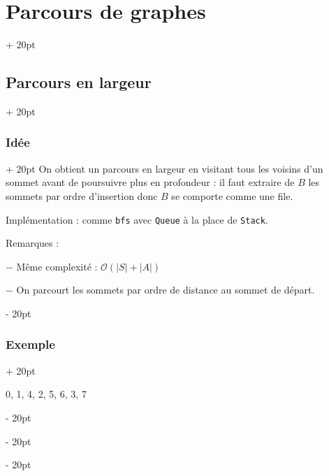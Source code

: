 \documentclass[a4paper, 12pt, twoside]{article}
\newcommand{\abs}[1]{\left\lvert #1 \right\rvert}
\newcommand{\ind}[1][20pt]{\advance\leftskip + #1}
\newcommand{\deind}[1][20pt]{\advance\leftskip - #1}
\newenvironment{indt}[2][20pt]{#2 \par \ind[#1]}{\par \deind} %
\begin{document}
\begin{indt}{\section{Parcours de graphes}}
        \vspace{12pt}
        
        \begin{indt}{\subsection{Parcours en largeur}}
            \begin{indt}{\subsubsection{Idée}}
                On obtient un parcours en largeur en visitant tous les voisins d'un sommet avant de poursuivre plus en profondeur : il faut extraire de $B$ les sommets par ordre d'insertion donc $B$ se comporte comme une file.

                Implémentation : comme \texttt{bfs} avec \texttt{Queue} à la place de \texttt{Stack}.

                Remarques :

                $-$ Même complexité : $\mathcal O(\abs S + \abs A)$

                $-$ On parcourt les sommets par ordre de distance au sommet de départ.
            \end{indt}

            \vspace{12pt}
            
            \begin{indt}{\subsubsection{Exemple}}
                \begin{center}
                \end{center}

                0, 1, 4, 2, 5, 6, 3, 7
            \end{indt}
        \end{indt}
    \end{indt}
    
    
    
\end{document}

